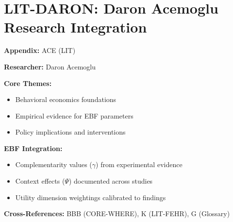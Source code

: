 %
%

\chapter{LIT-DARON: Daron Acemoglu Research Integration}
\label{app:ace}

\begin{abstract}
This appendix integrates the research contributions of Daron Acemoglu into the
Evidence-Based Framework. It documents key papers, core findings, and their
integration with EBF dimensions including complementarity parameters ($\gamma$),
context factors ($\Psi$), and utility dimensions.
\end{abstract}

\begin{tcolorbox}[colback=blue!5!white, colframe=blue!75!black,
    title=Quick Reference: Daron Acemoglu Research]

\textbf{Appendix:} ACE (LIT)

\textbf{Researcher:} Daron Acemoglu

\textbf{Core Themes:}
\begin{itemize}[nosep]
\item Behavioral economics foundations
\item Empirical evidence for EBF parameters
\item Policy implications and interventions
\end{itemize}

\textbf{EBF Integration:}
\begin{itemize}[nosep]
\item Complementarity values ($\gamma$) from experimental evidence
\item Context effects ($\Psi$) documented across studies
\item Utility dimension weightings calibrated to findings
\end{itemize}

\textbf{Cross-References:} BBB (CORE-WHERE), K (LIT-FEHR), G (Glossary)
\end{tcolorbox}

